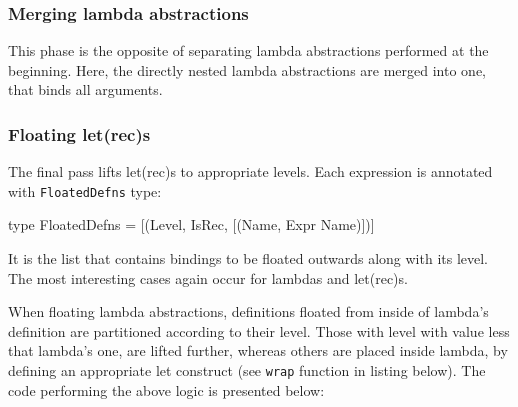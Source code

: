 \documentclass[12pt,a4paper]{report}
\begin{document}
\subsubsection{Merging lambda abstractions}
This phase is the opposite of separating lambda abstractions performed at the
beginning. Here, the directly nested lambda abstractions are merged into one,
that binds all arguments.

\subsubsection{Floating let(rec)s}
The final pass lifts let(rec)s to appropriate levels. Each expression is
annotated with \texttt{FloatedDefns} type:

\vspace*{0.2in}
\begin{code}[style=haskell]
type FloatedDefns = [(Level, IsRec, [(Name, Expr Name)])]
\end{code}

It is the list that contains bindings to be floated outwards along with its
level. The most interesting cases again occur for lambdas and let(rec)s.

When floating lambda abstractions, definitions floated from inside of lambda's
definition are partitioned according to their level. Those with level with
value less that lambda's one, are lifted further, whereas others are placed
inside lambda, by defining an appropriate let construct (see \texttt{wrap}
function in listing below). The code performing the above logic is presented
below:

\vspace*{0.2in}
\end{document}
